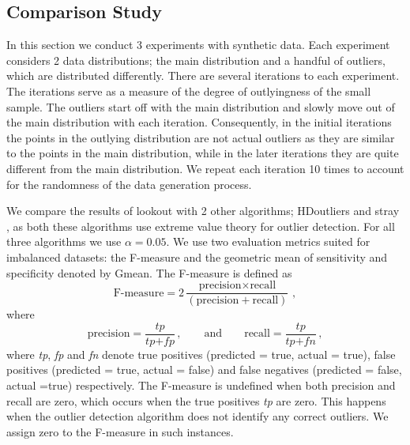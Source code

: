 \documentclass[letter,12pt]{article}
\begin{document}
\subsection{Comparison Study}\label{sec:SyntheticComparison}
In this section we conduct 3 experiments with synthetic data. Each experiment considers 2 data distributions; the main distribution and a handful of outliers, which are distributed differently. There are several iterations to each experiment. The iterations serve as a measure of the degree of outlyingness of the small sample. The outliers start off with the main distribution and slowly move out of the main distribution with each iteration. Consequently, in the initial iterations the points in the outlying distribution are not actual outliers as they are similar to the points in the main distribution, while in the later iterations they are quite different from the main distribution.  We repeat each iteration 10 times to account for the randomness of the data generation process.  

We compare the results of lookout with 2 other algorithms; HDoutliers \citep{wilkinson2017visualizing} and stray \citep{pridiltal}, as both these algorithms use extreme value theory for outlier detection.  For all three algorithms we use $\alpha = 0.05$.  We use two evaluation metrics suited for imbalanced datasets: the F-measure and the geometric mean of sensitivity and specificity denoted by Gmean. The F-measure is defined as
\begin{equation}\label{eq:fmeasure}
    \text{F-measure} =  2\frac{\text{precision} \times \text{recall}}{\left( \text{precision} + \text{recall} \right) } \, , 
\end{equation}
where 
\begin{equation}\label{eq:pr}
    \text{precision} =  \frac{ \textit{tp} }{\textit{tp} + \textit{fp}} \, ,  \qquad \text{and} \qquad \text{recall} = \frac{\textit{tp}}{\textit{tp} + \textit{fn}} \, ,
\end{equation}
where \textit{tp}, \textit{fp} and \textit{fn} denote true positives (predicted = true, actual = true), false positives (predicted = true, actual = false) and false negatives (predicted = false, actual =true) respectively. The F-measure is undefined when both precision and recall are zero, which occurs when the true positives \textit{tp} are zero. This happens when the outlier detection algorithm does not identify any correct outliers. We assign zero to the F-measure in such instances. 
\end{document}
